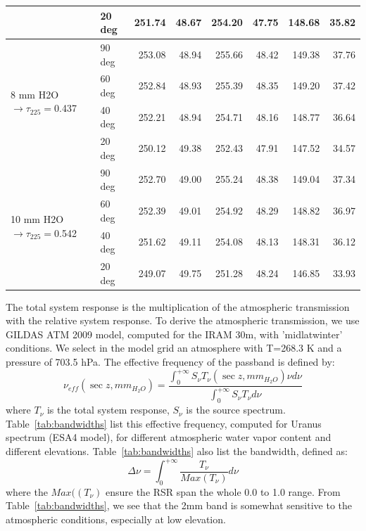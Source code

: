 \begin{table}[h]
\begin{tabular}{|l|l|r|r|r|r|r|r|}
 & 20 deg & 251.74 & 48.67 & 254.20 & 47.75 & 148.68 & 35.82 \\
\hline
\multirow{4}{*}{8 mm H2O $\rightarrow \tau_{225}=$0.437} & 90 deg &  253.08 & 48.94 & 255.66 & 48.42 & 149.38 & 37.76 \\
 & 60 deg & 252.84 & 48.93 & 255.39 & 48.35 & 149.20 & 37.42 \\
 & 40 deg & 252.21 & 48.94 & 254.71 & 48.16 & 148.77 & 36.64 \\
 & 20 deg & 250.12 & 49.38 & 252.43 & 47.91 & 147.52 & 34.57 \\
\hline
\multirow{4}{*}{10 mm H2O $\rightarrow \tau_{225}=$0.542} & 90 deg &  252.70 & 49.00 & 255.24 & 48.38 & 149.04 & 37.34 \\
 & 60 deg & 252.39 & 49.01 & 254.92 & 48.29 & 148.82 & 36.97 \\
 & 40 deg & 251.62 & 49.11 & 254.08 & 48.13 & 148.31 & 36.12 \\
 & 20 deg & 249.07 & 49.75 & 251.28 & 48.24 & 146.85 & 33.93 \\
\hline
\end{tabular}
\end{table}


The total system response is the multiplication of the atmospheric
transmission with the relative system response. To derive the
atmospheric transmission, we use GILDAS ATM 2009 model, computed for
the IRAM 30m, with 'midlatwinter' conditions. We select in the model
grid an atmosphere with T=268.3 K and a pressure of 703.5 hPa. The
effective frequency of the passband is defined by:
\begin{equation}
\nu_{eff}( \sec z, mm_{H_{2}O}) = \frac{ \int_{0}^{+\infty} S_{\nu}
  T_{\nu}(\sec z, mm_{H_{2}O}) \nu d\nu } { \int_{0}^{+\infty} S_{\nu} T_{\nu} d\nu}
\label{eq:nueff0}
\end{equation}
where $T_{\nu}$ is the total system response, $S_{\nu}$ is the source
spectrum. Table~\ref{tab:bandwidths} list this effective frequency,
computed for Uranus spectrum (ESA4 model), for different atmospheric
water vapor content and different elevations. 
Table~\ref{tab:bandwidths} also list the bandwidth, defined as:
\begin{equation}
\Delta\nu = \int_{0}^{+\infty} \frac{T_{\nu}}{Max(T_{\nu})}
d\nu
\end{equation}
where the $Max((T_{\nu})$ ensure the RSR span the whole 0.0 to 1.0 range.
From Table~\ref{tab:bandwidths}, we see that the 2mm band is somewhat
sensitive to the atmospheric conditions, especially at low elevation.


